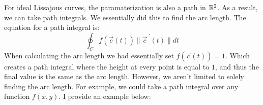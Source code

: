 For ideal Lissajous curves, the paramaterization is also a path in $\mathbb{R}^2$. As a result, we can take path integrals. We essentially did this to find the arc length. The equation for a path integral is: \[\oint_{C}f(\vec{c}(t))\|\vec{c}^{\ \prime}(t)\|dt\] When calculating the arc length we had essentially set $f(\vec{c}(t)) = 1$. Which creates a path integral where the height at every point is equal to $1$, and thus the final value is the same as the arc length. However, we aren't limited to solely finding the arc length. For example, we could take a path integral over any function $f(x,y)$. I provide an example below:
\begin{center}
\end{center}
